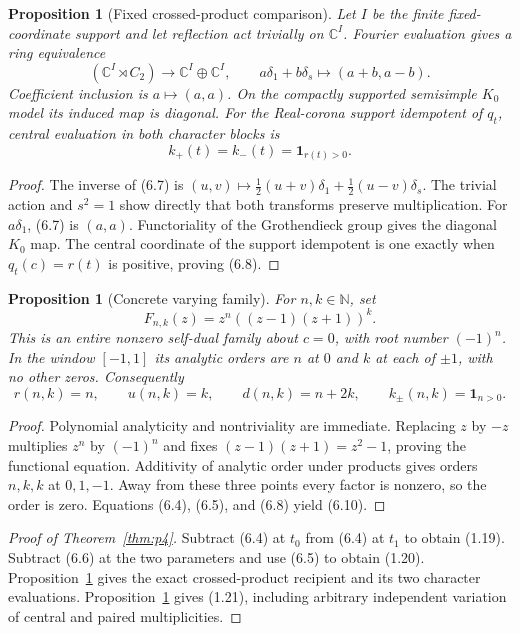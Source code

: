 \documentclass[11pt,reqno]{amsart}
\newtheorem{proposition}[theorem]{Proposition}
\newcommand{\C}{\mathbb C}
\newcommand{\N}{\mathbb N}
\begin{document}
\begin{proposition}[Fixed crossed-product comparison]\label{prop:fixedcrossed}
Let $I$ be the finite fixed-coordinate support and let reflection act trivially on $\C^I$.  Fourier
evaluation gives a ring equivalence
\[
       (\C^I\rtimes C_2)\longrightarrow\C^I\oplus\C^I,\qquad
       a\delta_1+b\delta_s\longmapsto(a+b,a-b).       \tag{6.7}
\]
Coefficient inclusion is $a\mapsto(a,a)$.  On the compactly supported semisimple $K_0$ model its
induced map is diagonal.  For the Real-corona support idempotent of $q_t$, central evaluation in
both character blocks is
\[
                         k_+(t)=k_-(t)=\mathbf1_{r(t)>0}.            \tag{6.8}
\]
\end{proposition}

\begin{proof}
The inverse of (6.7) is
$(u,v)\mapsto\frac12(u+v)\delta_1+\frac12(u-v)\delta_s$.  The trivial action and $s^2=1$ show
directly that both transforms preserve multiplication.  For $a\delta_1$, (6.7) is $(a,a)$.
Functoriality of the Grothendieck group gives the diagonal $K_0$ map.  The central coordinate of
the support idempotent is one exactly when $q_t(c)=r(t)$ is positive, proving (6.8).
\end{proof}

\begin{proposition}[Concrete varying family]\label{prop:polynomialfamily}
For $n,k\in\N$, set
\[
                       F_{n,k}(z)=z^n((z-1)(z+1))^k.                \tag{6.9}
\]
This is an entire nonzero self-dual family about $c=0$, with root number $(-1)^n$.  In the window
$[-1,1]$ its analytic orders are $n$ at $0$ and $k$ at each of $\pm1$, with no other zeros.
Consequently
\[
 r(n,k)=n,\qquad u(n,k)=k,\qquad d(n,k)=n+2k,\qquad
 k_\pm(n,k)=\mathbf1_{n>0}.                          \tag{6.10}
\]
\end{proposition}

\begin{proof}
Polynomial analyticity and nontriviality are immediate.  Replacing $z$ by $-z$ multiplies $z^n$
by $(-1)^n$ and fixes $(z-1)(z+1)=z^2-1$, proving the functional equation.  Additivity of analytic
order under products gives orders $n,k,k$ at $0,1,-1$.  Away from these three points every factor
is nonzero, so the order is zero.  Equations (6.4), (6.5), and (6.8) yield (6.10).
\end{proof}

\begin{proof}[Proof of Theorem~\ref{thm:p4}]
Subtract (6.4) at $t_0$ from (6.4) at $t_1$ to obtain (1.19).  Subtract (6.6) at the two parameters
and use (6.5) to obtain (1.20).  Proposition~\ref{prop:fixedcrossed} gives the exact crossed-product
recipient and its two character evaluations.  Proposition~\ref{prop:polynomialfamily} gives
(1.21), including arbitrary independent variation of central and paired multiplicities.
\end{proof}
\end{document}
